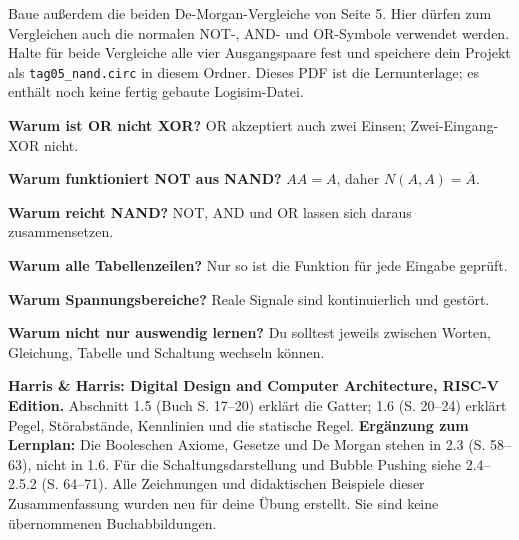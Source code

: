 \documentclass[10pt,a4paper]{article}
\newcommand{\block}[1]{\par\vspace{2mm}{\sffamily\large\bfseries #1}\par}
\newcommand{\code}[1]{\texttt{#1}}
\begin{document}
Baue außerdem die beiden De-Morgan-Vergleiche von Seite 5. Hier dürfen zum
Vergleichen auch die normalen NOT-, AND- und OR-Symbole verwendet werden.
Halte für beide Vergleiche alle vier Ausgangspaare fest und speichere dein
Projekt als \code{tag05\_nand.circ} in diesem Ordner. Dieses PDF ist die
Lernunterlage; es enthält noch keine fertig gebaute Logisim-Datei.

\block{Selbstkontrolle mit kurzen Antworten}
\textbf{Warum ist OR nicht XOR?} OR akzeptiert auch zwei Einsen; Zwei-Eingang-XOR nicht.
\par\textbf{Warum funktioniert NOT aus NAND?} $AA=A$, daher $N(A,A)=\overline A$.
\par\textbf{Warum reicht NAND?} NOT, AND und OR lassen sich daraus zusammensetzen.
\par\textbf{Warum alle Tabellenzeilen?} Nur so ist die Funktion für jede Eingabe geprüft.
\par\textbf{Warum Spannungsbereiche?} Reale Signale sind kontinuierlich und gestört.
\par\textbf{Warum nicht nur auswendig lernen?} Du solltest jeweils zwischen Worten,
Gleichung, Tabelle und Schaltung wechseln können.

\block{Lesestellen im vorgesehenen Buch}
\textbf{Harris \& Harris: Digital Design and Computer Architecture, RISC-V Edition.}
Abschnitt 1.5 (Buch S. 17--20) erklärt die Gatter; 1.6 (S. 20--24) erklärt
Pegel, Störabstände, Kennlinien und die statische Regel.
\textbf{Ergänzung zum Lernplan:} Die Booleschen Axiome, Gesetze und De Morgan
stehen in 2.3 (S. 58--63), nicht in 1.6. Für die Schaltungsdarstellung und
Bubble Pushing siehe 2.4--2.5.2 (S. 64--71).
Alle Zeichnungen und didaktischen Beispiele dieser Zusammenfassung wurden neu
für deine Übung erstellt. Sie sind keine übernommenen Buchabbildungen.
\end{document}
